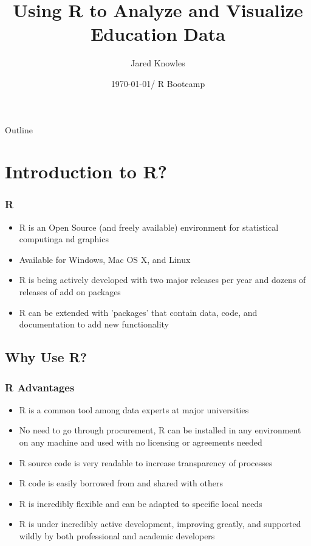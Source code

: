 \documentclass{beamer}
\title{Using R to Analyze and Visualize Education Data}
\author{Jared Knowles}
\institute[DPI] %
{
  Policy Research Advisor\\
  Wisconsin Department of Public Instruction
}
\date[R Bootcamp] %
{\today / R Bootcamp}
\begin{document}
\begin{frame}
  \titlepage
\end{frame}


\begin{frame}{Outline}
  \tableofcontents
\end{frame}



\section{Introduction to R?}

\begin{frame}
\frametitle{\textbf{R}}
  \begin{itemize}
  \item R is an Open Source (and freely available) environment for statistical computinga nd graphics
  \item Available for Windows, Mac OS X, and Linux
  \item R is being actively developed with two major releases per year and dozens of releases of add on packages
  \item R can be extended with 'packages' that contain data, code, and documentation to add new functionality
  \end{itemize}
\end{frame}

\subsection{Why Use R?}
\begin{frame}
\frametitle{R Advantages}
\begin{itemize}
  \item R is a common tool among data experts at major universities
  \item No need to go through procurement, R can be installed in any environment on any machine and used with no licensing or agreements needed
  \item R source code is very readable to increase transparency of processes
  \item R code is easily borrowed from and shared with others
  \item R is incredibly flexible and can be adapted to specific local needs
  \item R is under incredibly active development, improving greatly, and supported wildly by both professional and academic developers
  \end{itemize}
\end{frame}
\end{document}
